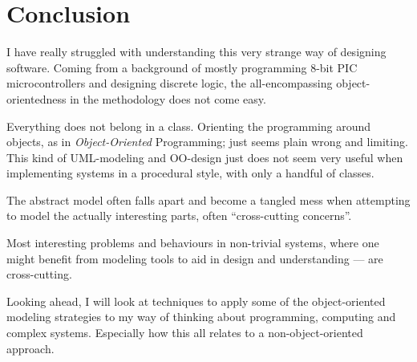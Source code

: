 %
%
%


\section{Conclusion}
%
%
I have really struggled with understanding this very strange way of designing
software. Coming from a background of mostly programming 8-bit PIC
microcontrollers and designing discrete logic, the all-encompassing
object-orientedness in the methodology does not come easy.

Everything does not belong in a class. Orienting the programming around
objects, as in \emph{Object-Oriented} Programming; just seems plain wrong and
limiting.  This kind of UML-modeling and OO-design just does not seem very
useful when implementing systems in a procedural style, with only a handful of
classes.

The abstract model often falls apart and become a tangled mess when attempting
to model the actually interesting parts, often ``cross-cutting concerns''. 

Most interesting problems and behaviours in non-trivial systems, where one
might benefit from modeling tools to aid in design and understanding --- are
cross-cutting\cite{youtube:blow-software-quality}.

Looking ahead, I will look at techniques to apply some of the object-oriented
modeling strategies to my way of thinking about programming, computing and
complex systems. Especially how this all relates to a non-object-oriented
approach.
